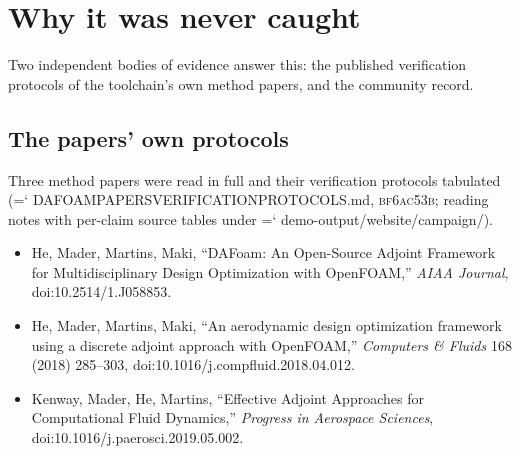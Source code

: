 \documentclass[11pt,a4paper]{article}
\newcommand{\artifact}[1]{{\small\ttfamily\hyphenchar\font=`\-\relax
  \def\_{\textunderscore\allowbreak}#1}}
\newcommand{\commit}[1]{\textsc{\small #1}}
\begin{document}
\section{Why it was never caught}
\label{sec:whynot}

Two independent bodies of evidence answer this: the published verification protocols of the
toolchain's own method papers, and the community record.

\subsection{The papers' own protocols}

Three method papers were read in full and their verification protocols tabulated
(\artifact{DAFOAM\_PAPERS\_VERIFICATION\_PROTOCOLS.md}, \commit{bf6ac53b}; reading notes with
per-claim source tables under \artifact{demo-output/website/campaign/}).

\begin{itemize}
\item He, Mader, Martins, Maki, ``DAFoam: An Open-Source Adjoint Framework for
Multidisciplinary Design Optimization with OpenFOAM,'' \emph{AIAA Journal},
doi:10.2514/1.J058853.
\item He, Mader, Martins, Maki, ``An aerodynamic design optimization framework using a
discrete adjoint approach with OpenFOAM,'' \emph{Computers \& Fluids} 168 (2018) 285--303,
doi:10.1016/j.compfluid.2018.04.012.
\item Kenway, Mader, He, Martins, ``Effective Adjoint Approaches for Computational Fluid
Dynamics,'' \emph{Progress in Aerospace Sciences}, doi:10.1016/j.paerosci.2019.05.002.
\end{itemize}
\end{document}
